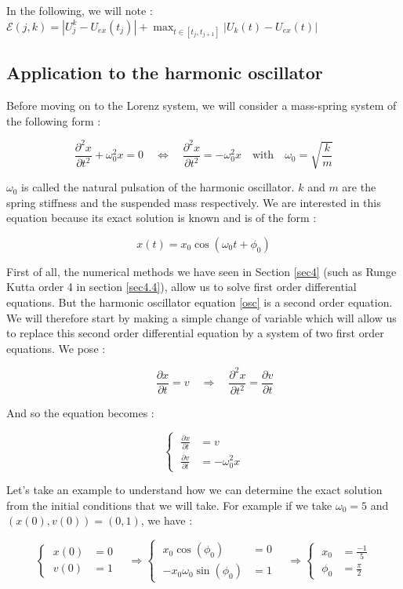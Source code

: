 \noindent In the following, we will note : \quad $\mathcal{E}(j,k)=|U_j^k-U_{ex}(t_j)|+\max_{t\in[t_j,t_{j+1}]}|U_k(t)-U_{ex}(t)|$

\subsection{Application to the harmonic oscillator}

\noindent Before moving on to the Lorenz system, we will consider a mass-spring system of the following form :

\begin{equation}
	\frac{\partial^2 x}{\partial t^2}+\omega_0^2 x = 0 \quad \iff \quad \frac{\partial^2 x}{\partial t^2}=-\omega_0^2 x \quad \text{with} \quad \omega_0=\sqrt{\frac{k}{m}}
	\label{osc}
\end{equation}

\noindent $\omega_0$ is called the natural pulsation of the harmonic oscillator. $k$ and $m$ are the spring stiffness and the suspended mass respectively. We are interested in this equation because its exact solution is known and is of the form :

$$x(t) = x_0 \cos(\omega_{0}t+\phi_0)$$

\noindent First of all, the numerical methods we have seen in Section \ref{sec4} (such as Runge Kutta order 4 in section \ref{sec4.4}), allow us to solve first order differential equations. But the harmonic oscillator equation \ref{osc} is a second order equation. We will therefore start by making a simple change of variable which will allow us to replace this second order differential equation by a system of two first order equations. We pose :
 
$$\qquad \frac{\partial x}{\partial t}=v \quad \Rightarrow \quad \frac{\partial^2 x}{\partial t^2}=\frac{\partial v}{\partial t}$$

\noindent And so the equation becomes :

$$\left\{\;\begin{aligned}
	\frac{\partial x}{\partial t}&=v \\
	\frac{\partial v}{\partial t}&=-\omega_0^2 x
\end{aligned}\right.
$$

\noindent Let's take an example to understand how we can determine the exact solution from the initial conditions that we will take. For example if we take $\omega_0=5$ and $(x(0),v(0))=(0,1)$, we have :

$$\left\{\;\begin{aligned}
	x(0)&=0 \\
	v(0)&=1
\end{aligned}\right. \quad \Rightarrow 
\left\{\;\begin{aligned}
	x_0 \cos(\phi_0)&=0 \\
	-x_0 \omega_{0} \sin(\phi_0)&=1
\end{aligned}\right.  \quad \Rightarrow  
\left\{\;\begin{aligned}
	x_0&=\frac{-1}{5} \\
	\phi_0&=\frac{\pi}{2}
\end{aligned}\right.
$$

